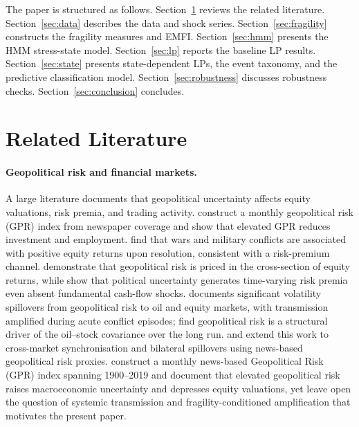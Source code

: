 \documentclass[11pt]{article}
\begin{document}
The paper is structured as follows.
Section~\ref{sec:literature} reviews the related literature.
Section~\ref{sec:data} describes the data and shock series.
Section~\ref{sec:fragility} constructs the fragility measures and EMFI.
Section~\ref{sec:hmm} presents the HMM stress-state model.
Section~\ref{sec:lp} reports the baseline LP results.
Section~\ref{sec:state} presents state-dependent LPs, the event taxonomy, and the predictive classification model.
Section~\ref{sec:robustness} discusses robustness checks.
Section~\ref{sec:conclusion} concludes.

\section{Related Literature}
\label{sec:literature}

\paragraph{Geopolitical risk and financial markets.}
A large literature documents that geopolitical uncertainty affects equity
valuations, risk premia, and trading activity.
\citet{caldara2022measuring} construct a monthly geopolitical risk (GPR)
index from newspaper coverage and show that elevated GPR reduces investment
and employment.
\citet{berkman2011war} find that wars and military conflicts are associated
with positive equity returns upon resolution, consistent with a risk-premium
channel.
\citet{liuzhang2021} demonstrate that geopolitical risk is priced in the
cross-section of equity returns, while \citet{pastorveronesi2013} show that
political uncertainty generates time-varying risk premia even absent
fundamental cash-flow shocks.
\citet{smales2021} documents significant volatility spillovers from geopolitical
risk to oil and equity markets, with transmission amplified during acute
conflict episodes; \citet{antonakakis2017} find geopolitical risk is a
structural driver of the oil--stock covariance over the long run.
\citet{su2022} and \citet{jiang2024} extend this work to cross-market
synchronisation and bilateral spillovers using news-based geopolitical risk proxies.
\citet{caldara2022measuring} construct a monthly news-based Geopolitical
Risk (GPR) index spanning 1900--2019 and document that elevated geopolitical
risk raises macroeconomic uncertainty and depresses equity valuations, yet
leave open the question of systemic transmission and fragility-conditioned
amplification that motivates the present paper.
\end{document}

